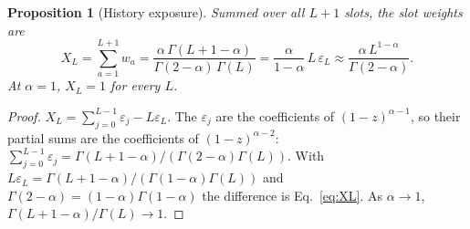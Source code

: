 \documentclass[11pt,a4paper]{article}
\newtheorem{proposition}{Proposition}
\begin{document}
\begin{proposition}[History exposure]
\label{prop:exposure}
Summed over all $L+1$ slots, the slot weights are
\begin{equation}
X_L = \sum_{a=1}^{L+1} w_a = \frac{\alpha\, \Gamma(L+1-\alpha)}{\Gamma(2-\alpha)\, \Gamma(L)} = \frac{\alpha}{1-\alpha}\, L\, \varepsilon_L \approx \frac{\alpha\, L^{1-\alpha}}{\Gamma(2-\alpha)}.
\label{eq:XL}
\end{equation}
At $\alpha = 1$, $X_L = 1$ for every $L$.
\end{proposition}
\begin{proof}
$X_L = \sum_{j=0}^{L-1} \varepsilon_j - L\varepsilon_L$. The $\varepsilon_j$ are the coefficients of $(1-z)^{\alpha-1}$, so their partial sums are the coefficients of $(1-z)^{\alpha-2}$: $\sum_{j=0}^{L-1}\varepsilon_j = \Gamma(L+1-\alpha)/(\Gamma(2-\alpha)\Gamma(L))$. With $L\varepsilon_L = \Gamma(L+1-\alpha)/(\Gamma(1-\alpha)\Gamma(L))$ and $\Gamma(2-\alpha) = (1-\alpha)\Gamma(1-\alpha)$ the difference is Eq.~\eqref{eq:XL}. As $\alpha\to1$, $\Gamma(L+1-\alpha)/\Gamma(L) \to 1$.
\end{proof}
\end{document}
